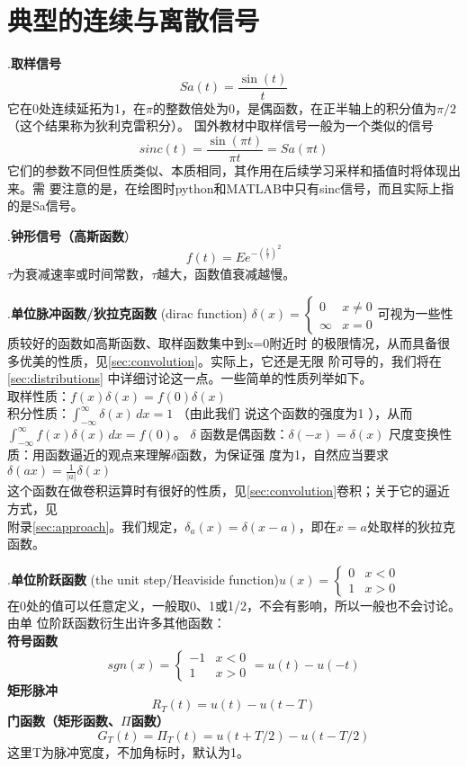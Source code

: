 \documentclass{ctexbook}
\begin{document}
\section{典型的连续与离散信号}
.\textbf{取样信号}\[Sa(t)=\frac{\sin(t)}{t}\]
它在0处连续延拓为1，在$\pi$的整数倍处为0，是偶函数，在正半轴上的积分值为$\pi /2$（这个结果称为狄利克雷积分）。
国外教材中取样信号一般为一个类似的信号\[sinc(t)=\frac{\sin(\pi t)}{\pi t}=Sa(\pi t)\]
它们的参数不同但性质类似、本质相同，其作用在后续学习采样和插值时将体现出来。需
要注意的是，在绘图时python和MATLAB中只有sinc信号，而且实际上指的是Sa信号。

.\textbf{钟形信号（高斯函数}）\[f(t)=Ee^{-{\left(\frac{t}{\tau }\right)}^2}\]
$\tau$为衰减速率或时间常数，$\tau$越大，函数值衰减越慢。

.\textbf{单位脉冲函数/狄拉克函数} (dirac function)
$\delta (x)=\begin{cases}
        0      & x\neq 0 \\
        \infty & x=0
    \end{cases}$可视为一些性质较好的函数如高斯函数、取样函数集中到x=0附近时
的极限情况，从而具备很多优美的性质，见\ref{sec:convolution}。实际上，它还是无限
阶可导的，我们将在\ref{sec:distributions}
中详细讨论这一点。一些简单的性质列举如下。\\
 取样性质：$f(x)\delta (x)=f(0)\delta (x)$\\
 积分性质：$\int_{-\infty}^{\infty}\delta (x)\,dx=1$ （由此我们
说这个函数的强度为1 ），从而
$\int_{-\infty}^{\infty}f(x)\delta (x)\,dx=f(0)$。
 $\delta$ 函数是偶函数：$\delta (-x)=\delta (x)$
 尺度变换性质：用函数逼近的观点来理解$\delta $函数，为保证强
度为1，自然应当要求$\delta (ax)=\frac{1}{|a|}\delta (x)$\\
这个函数在做卷积运算时有很好的性质，见\ref{sec:convolution}卷积；关于它的逼近方式，见\\
附录\ref{sec:approach}。我们规定，$\delta_a(x)=\delta (x-a)$，即在$x=a$处取样的狄拉克函数。

.\textbf{单位阶跃函数} (the unit step/Heaviside function)$u(x)=
    \begin{cases}
        0 & x<0 \\
        1 & x>0
    \end{cases}$\\
在0处的值可以任意定义，一般取0、1或1/2，不会有影响，所以一般也不会讨论。由单
位阶跃函数衍生出许多其他函数：\\
\textbf{符号函数}\[sgn(x)=\begin{cases}
        -1 & x<0 \\
        1  & x>0
    \end{cases}=u(t)-u(-t)\]
\textbf{矩形脉冲}\[R_T(t)=u(t)-u(t-T)\]
\textbf{门函数（矩形函数、$\Pi $函数）}\[G_T(t)=\Pi_T(t)=u(t+T/2)-u(t-T/2)\]
这里T为脉冲宽度，不加角标时，默认为1。
\end{document}
